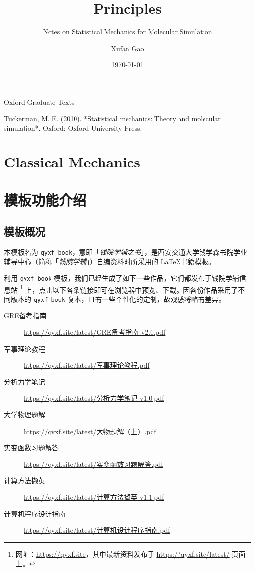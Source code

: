 \documentclass[
  10pt,
  twoside,
  openany,
  b5paper, %
  colorscheme = rbb, %
  xits = false,
]{qyxf-book}
\title{Principles}
\subtitle{Notes on Statistical Mechanics for Molecular Simulation}  %
\author{Xufan Gao}
\date{\today}
\begin{document}
\maketitle

\tableofcontents


Oxford Graduate Texts

Tuckerman, M. E. (2010). *Statistical mechanics: Theory and molecular simulation*. Oxford: Oxford University Press.


\chapter{Classical Mechanics}


\chapter{模板功能介绍}

\section{模板概况}

本模板名为 \verb|qyxf-book|，意即「\emph{钱院学辅之书}」，是西安交通大学钱学森书院学业辅导中心（简称「\emph{钱院学辅}」）自编资料时所采用的 \LaTeX 书籍模板。

利用 \verb|qyxf-book| 模板，我们已经生成了如下一些作品，它们都发布于钱院学辅信息站
\footnote{网址：\url{https://qyxf.site}，其中最新资料发布于 \url{https://qyxf.site/latest/} 页面上。}
上，点击以下各条链接即可在浏览器中预览、下载。因各份作品采用了不同版本的 \verb|qyxf-book| 复本，且有一些个性化的定制，故观感将略有差异。

\begin{tcolorbox}
  \begin{description}
    \item [GRE备考指南] \url{https://qyxf.site/latest/GRE备考指南-v2.0.pdf}
    \item [军事理论教程] \url{https://qyxf.site/latest/军事理论教程.pdf}
    \item [分析力学笔记] \url{https://qyxf.site/latest/分析力学笔记-v1.0.pdf}
    \item [大学物理题解] \url{https://qyxf.site/latest/大物题解（上）.pdf}
    \item [实变函数习题解答] \url{https://qyxf.site/latest/实变函数习题解答.pdf}
    \item [计算方法撷英] \url{https://qyxf.site/latest/计算方法撷英-v1.1.pdf}
    \item [计算机程序设计指南] \url{https://qyxf.site/latest/计算机设计程序指南.pdf}
  \end{description}
\end{tcolorbox}
\end{document}
